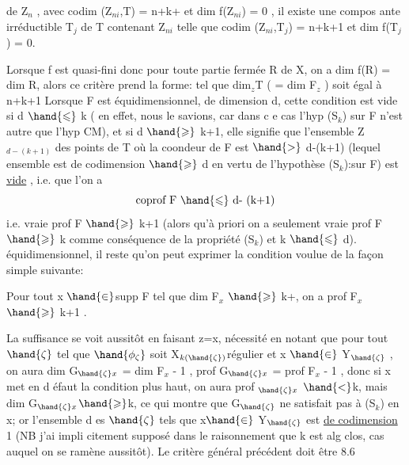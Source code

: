 
de Z$_n$ , avec codim (Z$_{ni}$,T) = n+k+ et dim f(Z$_{ni}$) = 0 , il existe
une compos ante irréductible T$_j$ de T contenant Z$_{ni}$ telle que
codim (Z$_{ni}$,T$_j$) = n+k+1 et dim f(T$_j$) = 0.

Lorsque f est quasi-fini donc pour toute partie fermée R de X,
on a dim f(R) = dim R, alors ce critère prend la forme:  
  tel que dim$_z$T ( = dim F$_z$ ) soit égal à
n+k+1  Lorsque F est équidimensionnel, 
de dimension d,  cette condition
est vide si d $\hand{\leqslant}$ k ( en effet, nous le savions, car dans c e cas l'hyp
(S$_k$) sur F n'est autre que l'hyp CM), et si d $\hand{\geqslant}$ k+1, elle signifie
que l'ensemble Z$_{d - (k+1)}$ des points de T où la coondeur de F est
$\hand{>}$ d-(k+1) (lequel ensemble est de codimension $\hand{\geqslant}$ d  en vertu de
l'hypothèse (S$_k$):sur F) est \uline{vide} , i.e. que 
l'on a 
\[ \text{coprof F } \hand{\leqslant} \text{ d- (k+1)} \]
i.e. vraie prof F $\hand{\geqslant}$ k+1
(alors qu'à priori on a seulement vraie prof F $\hand{\geqslant}$ k comme conséquence
de la propriété (S$_k$) et k $\hand{\leqslant}$ d).  
 équidimensionnel, il reste qu'on
peut exprimer la condition voulue de la façon simple suivante:

 Pour tout  x $\hand{\in}$supp F tel que dim F$_x$ $\hand{\geqslant}$ k+, on a prof F$_x$ $\hand{\geqslant}$ k+1 .

La suffisance se voit aussitôt en faisant z=x,  nécessité   en
notant que pour tout $\hand{\zeta}$ tel que $\hand{\phi_\zeta}$ soit X$_{k(\hand{\zeta})}$\hand{-}régulier et x $\hand{\in}$ Y$_{\hand{\zeta}}$ ,
on aura dim G$_{\hand{\zeta} x}$ = dim F$_x$ - 1 , prof G$_{\hand{\zeta} x}$ = prof F$_x$ - 1 , donc si
x met en d éfaut la condition plus haut, on aura prof $_{\hand{\zeta} x}$ $\hand{<}$k, mais
dim G$_{\hand{\zeta} x}$$\hand{\geqslant}$k, ce qui montre que G$_{\hand{\zeta}}$ ne satisfait pas à (S$_k$) en x; or
l'ensemble d es $\hand{\zeta}$ tels que x$\hand{\in}$ Y$_{\hand{\zeta}}$ est \uline{de codimension} 1 (NB j'ai impli
\margin{|} citement supposé dans le raisonnement que k est alg clos, cas auquel on
se ramène aussitôt). Le critère général précédent doit être   8.6
